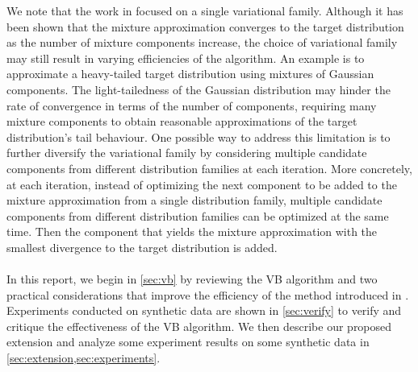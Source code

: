 We note that the work in \cite{miller2017variational} focused on a single variational family. Although it has been shown that the mixture approximation converges to the target distribution as the number of mixture components increase, the choice of variational family may still result in varying efficiencies of the algorithm. An example is to approximate a heavy-tailed target distribution using mixtures of Gaussian components. The light-tailedness of the Gaussian distribution may hinder the rate of convergence in terms of the number of components, requiring many mixture components to obtain reasonable approximations of the target distribution's tail behaviour. One possible way to address this limitation is to further diversify the variational family by considering multiple candidate components from different distribution families at each iteration. More concretely, at each iteration, instead of optimizing the next component to be added to the mixture approximation from a single distribution family, multiple candidate components from different distribution families can be optimized at the same time. Then the component that yields the mixture approximation with the smallest divergence to the target distribution is added.\\\\
In this report, we begin in \cref{sec:vb} by reviewing the VB algorithm and two practical considerations that improve the efficiency of the method introduced in \cite{miller2017variational}. Experiments conducted on synthetic data are shown in \cref{sec:verify} to verify and critique the effectiveness of the VB algorithm. We then describe our proposed extension and analyze some experiment results on some synthetic data in \cref{sec:extension,sec:experiments}.

